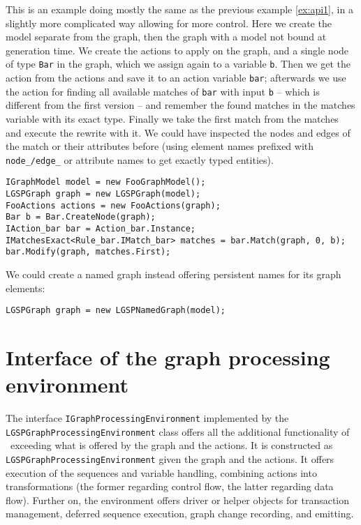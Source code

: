 \begin{example}
This is an example doing mostly the same as the previous example \ref{ex:api1}, in a slightly more complicated way allowing for more control.
Here we create the model separate from the graph, then the graph with a model not bound at generation time.
We create the actions to apply on the graph, and a single node of type \texttt{Bar} in the graph, which we assign again to a variable \texttt{b}.
Then we get the action from the actions and save it to an action variable \texttt{bar};
afterwards we use the action for finding all available matches of \texttt{bar} with input \texttt{b} -- which is different from the first version -- and remember the found matches in the matches variable with its exact type.
Finally we take the first match from the matches and execute the rewrite with it.
We could have inspected the nodes and edges of the match or their attributes before (using element names prefixed with \texttt{node\_/edge\_} or attribute names to get exactly typed entities). 
\begin{verbatim}
IGraphModel model = new FooGraphModel();
LGSPGraph graph = new LGSPGraph(model);
FooActions actions = new FooActions(graph);
Bar b = Bar.CreateNode(graph);
IAction_bar bar = Action_bar.Instance;
IMatchesExact<Rule_bar.IMatch_bar> matches = bar.Match(graph, 0, b);
bar.Modify(graph, matches.First);
\end{verbatim}

We could create a named graph instead offering persistent names for its graph elements:
\begin{verbatim}
LGSPGraph graph = new LGSPNamedGraph(model);
\end{verbatim}
\end{example}

\section{Interface of the graph processing environment}

The interface \texttt{IGraphProcessingEnvironment} implemented by the \texttt{LGSPGraphProcessing\-Environment} class offers all the additional functionality of \GrG~exceeding what is offered by the graph and the actions.
It is constructed as \texttt{LGSPGraphProcessingEnvironment} given the graph and the actions.
It offers execution of the sequences and variable handling, combining actions into transformations
(the former regarding control flow, the latter regarding data flow).
Further on, the environment offers driver or helper objects for transaction management, deferred sequence execution, graph change recording, and emitting.

